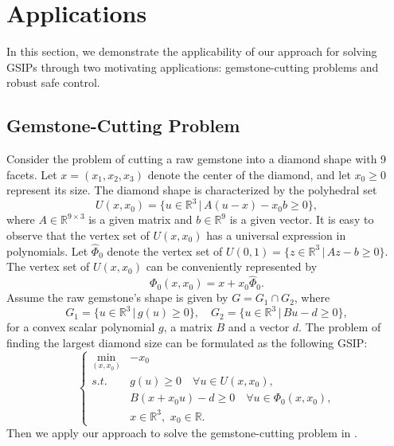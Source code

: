 \documentclass{amsart}
\theoremstyle{plain}
\newcommand{\re}{\mathbb{R}}
\newcommand{\st}{\mathit{s.t.}}
\numberwithin{equation}{section}
\begin{document}
		
		
		
		
		
		
		
		
		
		\section{Applications}\label{sec:applications}
		In this section, we demonstrate the applicability of our approach for 
        solving GSIPs through two motivating applications: 
        gemstone-cutting problems and robust safe control.
		
		
		
		
		\subsection{Gemstone-Cutting Problem}\label{ssc:gemcutting}
        Consider the problem of cutting a raw gemstone into a diamond shape with 9 facets. 
		Let $x= (x_1,x_2,x_3)$ denote the center of the diamond, 
        and let $x_0 \ge 0$ represent its size. The diamond shape is characterized by the
        polyhedral set
		\[
		U(x,x_0) = \{u\in\re^3\,\vert\, A(u-x)-x_0 b\ge 0\},
		\]
        where $A\in\re^{9\times 3}$ is a given matrix and $b\in\re^9$ is a given vector.
        It is easy to observe that the vertex set of $U(x,x_0)$ has a universal expression
        in polynomials. 
        Let $\hat{\Phi}_0$ denote the vertex set of $U(0,1) = \{z\in\re^3\,\vert\, Az-b\ge 0\}$.
        The vertex set of $U(x,x_0)$ can be conveniently represented by 
		\[
        \Phi_0(x,x_0) = x+x_0\hat{\Phi}_0.
        \]
		Assume the raw gemstone's shape is given by $G = G_1\cap G_2$, where
		\[
		G_1 = \{u\in\re^3\,\vert\, g(u)\ge 0\},\quad
		G_2 = \{u\in\re^3\,\vert\, Bu-d\ge 0\},
		\]
		for a convex scalar polynomial $g$, a matrix $B$ and a vector $d$.
        The problem of finding the largest diamond size can be formulated as the following GSIP:
	\begin{equation}\label{eq:gemstoneSIP}
		\left\{
		\begin{array}{cl}
			\min\limits_{(x,x_0)} & -x_0 \\
			\st & g(u)\geq 0\quad  \forall u\in U(x,x_0),\\
			& B(x+x_0u)-d\ge 0\quad\forall u\in \Phi_0(x,x_0),\\
			& x\in\re^3,\,\, x_0\in\re.
		\end{array}
		\right.
	\end{equation}
	Then we apply our approach to solve the gemstone-cutting problem in \cite{nguyen1992computing}.
\end{document}
